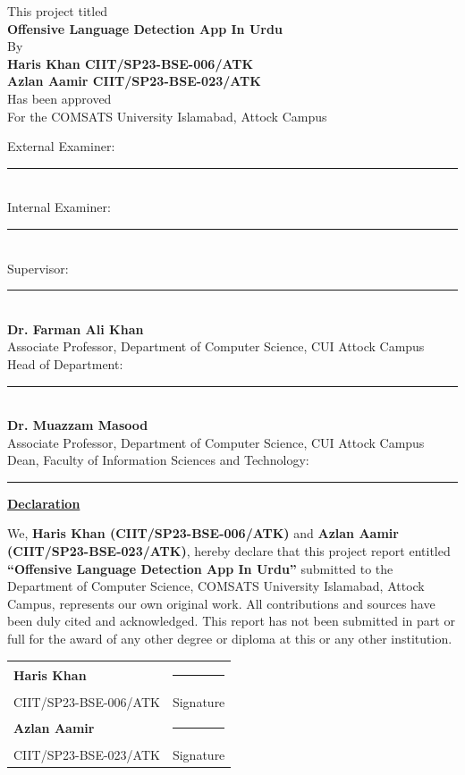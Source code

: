 \documentclass[A4paper,12pt]{report}
\theoremstyle{plain}
\theoremstyle{definition}
\theoremstyle{remark}
\numberwithin{equation}{section}
\begin{document}
\begin{center}
\normalsize {This project titled} \\[0.2in]
\large{\textbf{Offensive Language Detection App In Urdu}} \\[0.2in]
\normalsize{By} \\[0.1in]
\textbf{Haris Khan \quad CIIT/SP23-BSE-006/ATK} \\
\textbf{Azlan Aamir \quad CIIT/SP23-BSE-023/ATK} \\[0.2in]
\normalsize{Has been approved} \\
\normalsize{For the COMSATS University Islamabad, Attock Campus}
\end{center}
\vspace{0.3in}
\begin{flushleft}
External Examiner: \rule{5cm}{0.4pt} \\
\vspace{0.2in}
Internal Examiner: \rule{5cm}{0.4pt} \\
\vspace{0.2in}
Supervisor: \rule{5cm}{0.4pt} \\
\textbf{Dr. Farman Ali Khan} \\
Associate Professor, Department of Computer Science, CUI Attock Campus \\
\vspace{0.2in}
Head of Department: \rule{5cm}{0.4pt} \\
\textbf{Dr. Muazzam Masood} \\
Associate Professor, Department of Computer Science, CUI Attock Campus \\
\vspace{0.2in}
Dean, Faculty of Information Sciences and Technology: \rule{5cm}{0.4pt}
\end{flushleft}

\newpage
\begin{center}
\Large{\textbf{\underline{Declaration}}}
\end{center}
\vspace{0.2in}
\noindent We, \textbf{Haris Khan (CIIT/SP23-BSE-006/ATK)} and \textbf{Azlan Aamir (CIIT/SP23-BSE-023/ATK)}, hereby declare that this project report entitled \textbf{``Offensive Language Detection App In Urdu''} submitted to the Department of Computer Science, COMSATS University Islamabad, Attock Campus, represents our own original work. All contributions and sources have been duly cited and acknowledged. This report has not been submitted in part or full for the award of any other degree or diploma at this or any other institution.
\\[0.4in]
\noindent\begin{tabular}{ll}
\textbf{Haris Khan} & \rule{5cm}{0.4pt} \\
CIIT/SP23-BSE-006/ATK & Signature \\[0.3in]
\textbf{Azlan Aamir} & \rule{5cm}{0.4pt} \\
CIIT/SP23-BSE-023/ATK & Signature \\
\end{tabular}
\end{document}
